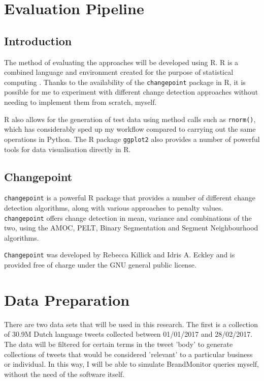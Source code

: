 \documentclass{uvamscse}	%
\begin{document}
\section{Evaluation Pipeline}

\subsection{Introduction}

The method of evaluating the approaches will be developed using \textsf{R}. \textsf{R} is a combined language and environment created for the purpose of statistical computing \cite{RCoreTeam2017}. Thanks to the availability of the \texttt{changepoint} package in \textsf{R}\cite{Killick2014}, it is possible for me to experiment with different change detection approaches without needing to implement them from scratch, myself.

\textsf{R} also allows for the generation of test data using method calls such as \texttt{rnorm()}, which has considerably sped up my workflow compared to carrying out the same operations in Python. The \textsf{R} package \texttt{ggplot2} \cite{Wickham2009} also provides a number of powerful tools for data visualisation directly in \textsf{R}.

\subsection{Changepoint}

\texttt{changepoint} is a powerful R package that provides a number of different change detection algorithms, along with various approaches to penalty values. \texttt{changepoint} offers change detection in mean, variance and combinations of the two, using the AMOC, PELT, Binary Segmentation and Segment Neighbourhood algorithms.

\texttt{Changepoint} was developed by Rebecca Killick and Idris A. Eckley and is provided free of charge under the GNU general public license.

\section{Data Preparation}

There are two data sets that will be used in this research. The first is a collection of 30.9M Dutch language tweets collected between 01/01/2017 and 28/02/2017. The data will be filtered for certain terms in the tweet 'body' to generate collections of tweets that would be considered 'relevant' to a particular business or individual. In this way, I will be able to simulate BrandMonitor queries myself, without the need of the software itself.
\end{document}
